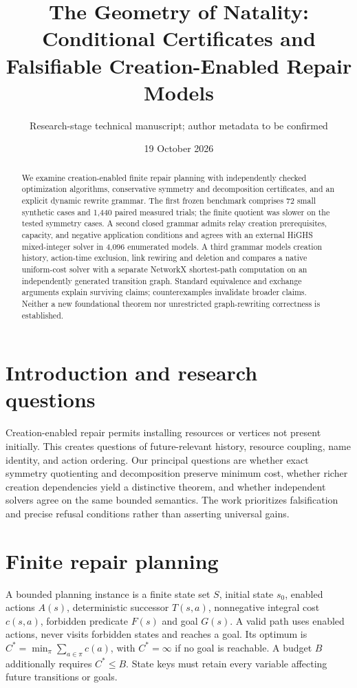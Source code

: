 \documentclass[10pt,a4paper]{article}
\title{The Geometry of Natality: Conditional Certificates and Falsifiable Creation-Enabled Repair Models}
\author{Research-stage technical manuscript; author metadata to be confirmed}
\date{19 October 2026}
\begin{document}
\maketitle
\begin{abstract}
We examine creation-enabled finite repair planning with independently checked optimization algorithms, conservative symmetry and decomposition certificates, and an explicit dynamic rewrite grammar. The first frozen benchmark comprises 72 small synthetic cases and 1,440 paired measured trials; the finite quotient was slower on the tested symmetry cases. A second closed grammar admits relay creation prerequisites, capacity, and negative application conditions and agrees with an external HiGHS mixed-integer solver in 4,096 enumerated models. A third grammar models creation history, action-time exclusion, link rewiring and deletion and compares a native uniform-cost solver with a separate NetworkX shortest-path computation on an independently generated transition graph. Standard equivalence and exchange arguments explain surviving claims; counterexamples invalidate broader claims. Neither a new foundational theorem nor unrestricted graph-rewriting correctness is established.
\end{abstract}
\section{Introduction and research questions}
Creation-enabled repair permits installing resources or vertices not present initially. This creates questions of future-relevant history, resource coupling, name identity, and action ordering. Our principal questions are whether exact symmetry quotienting and decomposition preserve minimum cost, whether richer creation dependencies yield a distinctive theorem, and whether independent solvers agree on the same bounded semantics. The work prioritizes falsification and precise refusal conditions rather than asserting universal gains.
\section{Finite repair planning}
A bounded planning instance is a finite state set $S$, initial state $s_0$, enabled actions $A(s)$, deterministic successor $T(s,a)$, nonnegative integral cost $c(s,a)$, forbidden predicate $F(s)$ and goal $G(s)$. A valid path uses enabled actions, never visits forbidden states and reaches a goal. Its optimum is $C^*=\min_{\pi}\sum_{a\in\pi}c(a)$, with $C^*=\infty$ if no goal is reachable. A budget $B$ additionally requires $C^*\le B$. State keys must retain every variable affecting future transitions or goals.
\end{document}
